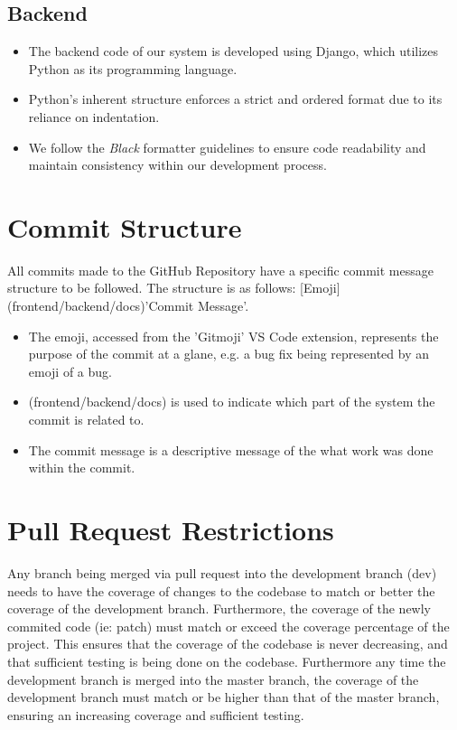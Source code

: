 \documentclass[12pt]{article}
\begin{document}
\subsection{Backend}
\begin{itemize}
    \item The backend code of our system is developed using Django, which utilizes Python as its programming language.
    \item Python's inherent structure enforces a strict and ordered format due to its reliance on indentation.
    \item We follow the \textit{Black} formatter guidelines to ensure code readability and maintain consistency within our development process.
\end{itemize}

\newpage

\section{Commit Structure}
All commits made to the GitHub Repository have a specific commit message structure to be followed. The structure is as follows: [Emoji](frontend/backend/docs)'Commit Message'.
\begin{itemize}
    \item The emoji, accessed from the 'Gitmoji' VS Code extension, represents the purpose of the commit at a glane, e.g. a bug fix being represented by an emoji of a bug.
    \item (frontend/backend/docs) is used to indicate which part of the system the commit is related to.
    \item The commit message is a descriptive message of the what work was done within the commit.
\end{itemize}

\newpage

\section{Pull Request Restrictions}
Any branch being merged via pull request into the development branch (dev) needs to have the coverage of changes to the codebase to match or better the coverage of the development branch. Furthermore, the coverage of the newly commited code (ie: patch) must match or exceed the coverage percentage of the project.
This ensures that the coverage of the codebase is never decreasing, and that sufficient testing is being done on the codebase.
Furthermore any time the development branch is merged into the master branch, the coverage of the development branch must match or be higher than that of the master branch, ensuring an increasing coverage and sufficient testing.
\end{document}
